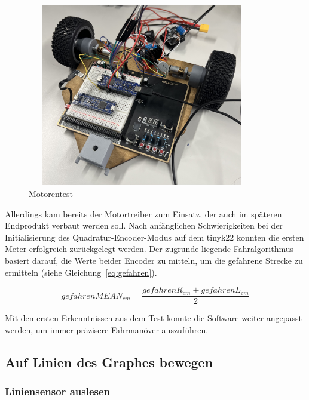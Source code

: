 \begin{figure}[H]
\centering
\includegraphics[width=10cm, height=8cm]{assets/ET/Motoren/Motorentest.jpeg}
\caption{Motorentest}
\label{fig: Motorentest}
\end{figure}


Allerdings kam bereits der Motortreiber zum Einsatz, der auch im späteren Endprodukt verbaut werden soll. Nach anfänglichen Schwierigkeiten bei der Initialisierung des Quadratur-Encoder-Modus auf dem \gls{tinyk22} konnten die ersten Meter erfolgreich zurückgelegt werden. Der zugrunde liegende Fahralgorithmus basiert darauf, die Werte beider Encoder zu mitteln, um die gefahrene Strecke zu ermitteln (siehe Gleichung~\ref{eq:gefahren}).

\begin{equation}
    gefahrenMEAN_{cm} = \frac{gefahrenR_{cm} + gefahrenL_{cm}} {2} 
    \label{eq:gefahren}
\end{equation}

Mit den ersten Erkenntnissen aus dem Test konnte die Software weiter angepasst werden, um immer präzisere Fahrmanöver auszuführen. 





\subsection{Auf Linien des Graphes bewegen}
\label{Auf Linien des Graphes bewegen}

\subsubsection{Liniensensor auslesen}
\label{Liniensensor auslesen}

